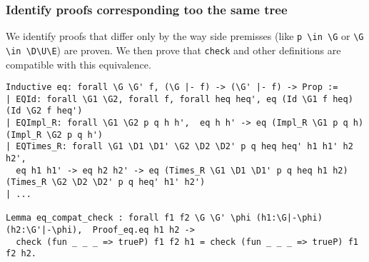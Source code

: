 \documentclass[runningheads,a4paper]{llncs}
\begin{document}
\subsubsection{Identify proofs corresponding too the same tree}
\label{sec:identif-same-tree}

We identify proofs that differ only by the way side premisses (like
\lstinline!p \in \G! or \lstinline!\G \in \D\U\E!) are proven. We then
prove that \texttt{check} and other definitions are compatible with
this equivalence.
\begin{lstlisting}
Inductive eq: forall \G \G' f, (\G |- f) -> (\G' |- f) -> Prop := 
| EQId: forall \G1 \G2, forall f, forall heq heq', eq (Id \G1 f heq) (Id \G2 f heq')
| EQImpl_R: forall \G1 \G2 p q h h',  eq h h' -> eq (Impl_R \G1 p q h) (Impl_R \G2 p q h')
| EQTimes_R: forall \G1 \D1 \D1' \G2 \D2 \D2' p q heq heq' h1 h1' h2 h2',
  eq h1 h1' -> eq h2 h2' -> eq (Times_R \G1 \D1 \D1' p q heq h1 h2)
(Times_R \G2 \D2 \D2' p q heq' h1' h2')
| ...

Lemma eq_compat_check : forall f1 f2 \G \G' \phi (h1:\G|-\phi) (h2:\G'|-\phi),  Proof_eq.eq h1 h2 -> 
  check (fun _ _ _ => trueP) f1 f2 h1 = check (fun _ _ _ => trueP) f1 f2 h2.
\end{lstlisting}








\end{document}
